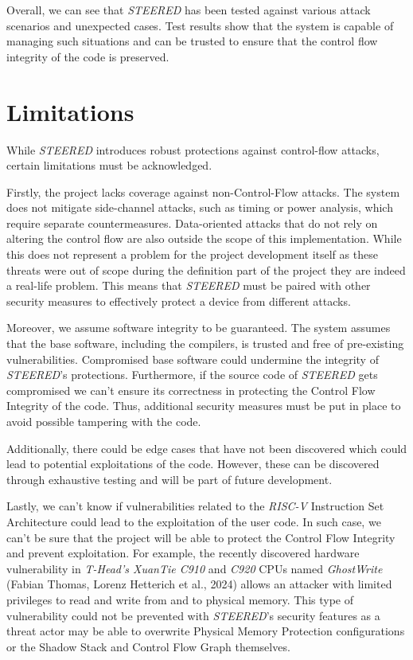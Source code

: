 Overall, we can see that \textit{STEERED} has been tested against various attack
scenarios and unexpected cases. Test results show that the system is capable of managing
such situations and can be trusted to ensure that the control flow integrity of the
code is preserved.

\section{Limitations}
\label{sec:ta_limitations}

While \textit{STEERED} introduces robust protections against control-flow attacks,
certain limitations must be acknowledged.

Firstly, the project lacks coverage against non-Control-Flow attacks. The system
does not mitigate side-channel attacks, such as timing or power analysis, which
require separate countermeasures. Data-oriented attacks that do not rely on altering
the control flow are also outside the scope of this implementation. While this
does not represent a problem for the project development itself as these threats
were out of scope during the definition part of the project they are indeed a
real-life problem. This means that \textit{STEERED} must be paired with other
security measures to effectively protect a device from different attacks.

Moreover, we assume software integrity to be guaranteed. The system assumes that
the base software, including the compilers, is trusted and free of pre-existing
vulnerabilities. Compromised base software could undermine the integrity of \textit{STEERED}'s
protections. Furthermore, if the source code of \textit{STEERED} gets compromised
we can't ensure its correctness in protecting the Control Flow Integrity of the code.
Thus, additional security measures must be put in place to avoid possible tampering
with the code.

Additionally, there could be edge cases that have not been discovered which
could lead to potential exploitations of the code. However, these can be
discovered through exhaustive testing and will be part of future development.

Lastly, we can't know if vulnerabilities related to the \textit{RISC-V}
Instruction Set Architecture could lead to the exploitation of the user code. In
such case, we can't be sure that the project will be able to protect the Control
Flow Integrity and prevent exploitation. For example, the recently discovered
hardware vulnerability in \textit{T-Head's XuanTie C910} and \textit{C920} CPUs
named \textit{GhostWrite}\cite{riscvuzz} (Fabian Thomas, Lorenz Hetterich et al.,
2024) allows an attacker with limited privileges to read and write from and to physical
memory. This type of vulnerability could not be prevented with \textit{STEERED}'s
security features as a threat actor may be able to overwrite Physical Memory Protection
configurations or the Shadow Stack and Control Flow Graph themselves.

